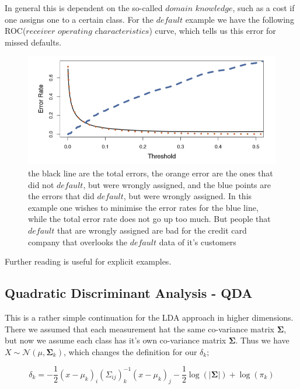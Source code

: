 \documentclass{article}
\begin{document}
In general this is dependent on the so-called $\textit{domain knowledge}$, such as a cost if one assigns one to a certain class. For the $default$ example we have the following ROC($\textit{receiver operating characteristics}$) curve, which tells us this error for missed defaults.

\begin{figure}[ht]
    \centering
    \includegraphics[width=\textwidth]{ROC_curve.png}
    \caption{the black line are the total errors, the orange error are the ones that did not $default$, but were wrongly assigned, and the blue points are the errors that did $default$, but were wrongly assigned. In this example one wishes to minimise the error rates for the blue line, while the total error rate does not go up too much. But people that $default$ that are wrongly assigned are bad for the credit card company that overlooks the $default$ data of it's customers}
    \label{fig:ROC_curve_example_default}
\end{figure}

Further reading is useful for explicit examples.

\subsection{Quadratic Discriminant Analysis - QDA}
This is a rather simple continuation for the LDA approach in higher dimensions. There we assumed that each measurement hat the same co-variance matrix $\mathbf{\Sigma}$, but now we assume each class has it's own co-variance matrix $\mathbf{\Sigma}$. Thus we have $X\sim \mathcal{N}(\mu,\mathbf{\Sigma}_k)$, which changes the definition for our $\delta_k$;

\begin{equation}
    \delta_k = -\frac{1}{2} (x-\mu_k)_i (\Sigma_{ij})^{-1}_k (x-\mu_k)_j -\frac{1}{2}\log(|\mathbf{\Sigma}|) +\log(\pi_k)
\end{equation}
\end{document}
